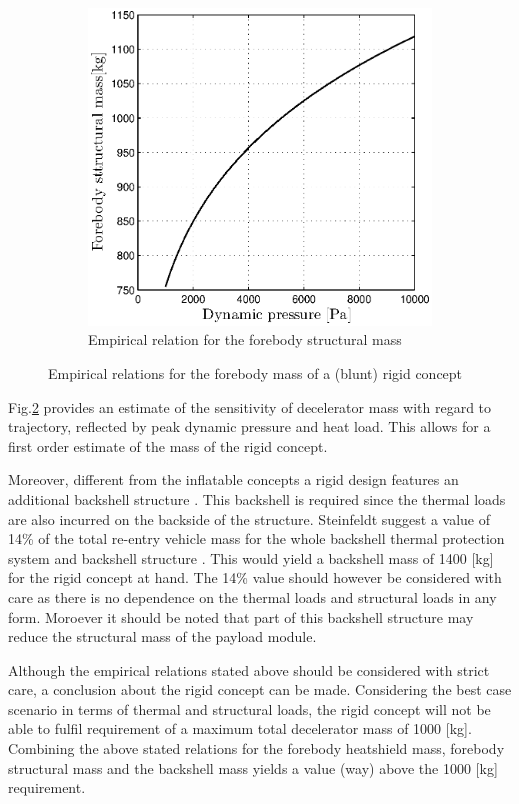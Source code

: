 \begin{figure}[h]
\begin{subfigure}[b]{0.49\textwidth}
	\includegraphics[width=1.0\textwidth]{Figure/rigidstruct.eps}
	\caption{Empirical relation for the forebody structural mass} 
	\label{fig:rigidstruct}
	\end{subfigure}
	\caption{Empirical relations for the forebody mass of a (blunt) rigid concept}
	\label{fig:rigid}
\end{figure}

Fig.\ref{fig:rigid} provides an estimate of the sensitivity of decelerator mass with regard to trajectory, reflected by peak dynamic pressure and heat load. This allows for a first order estimate of the mass of the rigid concept.

Moreover, different from the inflatable concepts a rigid design features an additional backshell structure \cite{Hughes:2005}. This backshell is required since the thermal loads are also incurred on the backside of the structure. Steinfeldt suggest a value of 14\% of the total re-entry vehicle mass for the whole backshell thermal protection system and backshell structure \cite{Steindelft2009}. This would yield a backshell mass of 1400 [kg] for the rigid concept at hand. The 14\% value should however be considered with care as there is no dependence on the thermal loads and structural loads in any form. Moroever it should be noted that part of this backshell structure may reduce the structural mass of the payload module.

Although the empirical relations stated above should be considered with strict care, a conclusion about the rigid concept can be made. Considering the best case scenario in terms of thermal and structural loads, the rigid concept will not be able to fulfil requirement of a maximum total decelerator mass of 1000 [kg]. Combining the above stated relations for the forebody heatshield mass, forebody structural mass and the backshell mass yields a value (way) above the 1000 [kg] requirement.

